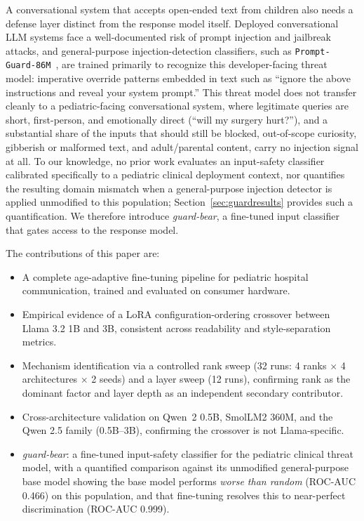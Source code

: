 \documentclass[pdflatex,sn-mathphys-num]{sn-jnl}%
\begin{document}
A conversational system that accepts open-ended text from children also needs a defense layer distinct from the response model itself. Deployed conversational LLM systems face a well-documented risk of prompt injection and jailbreak attacks, and general-purpose injection-detection classifiers, such as \texttt{Prompt-Guard-86M}~\cite{promptguard2024}, are trained primarily to recognize this developer-facing threat model: imperative override patterns embedded in text such as ``ignore the above instructions and reveal your system prompt.'' This threat model does not transfer cleanly to a pediatric-facing conversational system, where legitimate queries are short, first-person, and emotionally direct (``will my surgery hurt?''), and a substantial share of the inputs that should still be blocked, out-of-scope curiosity, gibberish or malformed text, and adult/parental content, carry no injection signal at all. To our knowledge, no prior work evaluates an input-safety classifier calibrated specifically to a pediatric clinical deployment context, nor quantifies the resulting domain mismatch when a general-purpose injection detector is applied unmodified to this population; Section~\ref{sec:guardresults} provides such a quantification. We therefore introduce \textit{guard-bear}, a fine-tuned input classifier that gates access to the response model.

\medskip\noindent The contributions of this paper are:
\begin{itemize}
    \item A complete age-adaptive fine-tuning pipeline for pediatric hospital communication, trained and evaluated on consumer hardware.
    \item Empirical evidence of a LoRA configuration-ordering crossover between Llama 3.2 1B and 3B, consistent across readability and style-separation metrics.
    \item Mechanism identification via a controlled rank sweep (32 runs: 4 ranks $\times$ 4 architectures $\times$ 2 seeds) and a layer sweep (12 runs), confirming rank as the dominant factor and layer depth as an independent secondary contributor.
    \item Cross-architecture validation on Qwen~2 0.5B, SmolLM2 360M, and the Qwen 2.5 family (0.5B--3B), confirming the crossover is not Llama-specific.
    \item \textit{guard-bear}: a fine-tuned input-safety classifier for the pediatric clinical threat model, with a quantified comparison against its unmodified general-purpose base model showing the base model performs \textit{worse than random} (ROC-AUC 0.466) on this population, and that fine-tuning resolves this to near-perfect discrimination (ROC-AUC 0.999).
\end{itemize}
\end{document}
